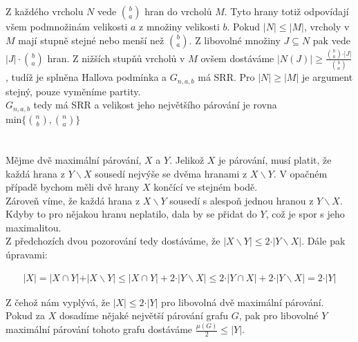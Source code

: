 \documentclass{scrartcl}
\begin{document}
        Z každého vrcholu $N$ vede $\binom{b}{a}$ hran do vrcholů $M$. Tyto hrany totiž odpovídají všem podmnožinám velikosti $a$ z množiny velikosti $b$. Pokud $\vert N \vert \leq \vert M \vert$, vrcholy v $M$ mají stupně stejné nebo menší než $\binom{b}{a}$. Z libovolné množiny $J \subseteq N$ pak vede $\vert J \vert \cdot \binom{b}{a}$ hran. Z nižších stupňů vrcholů v $M$ ovšem dostáváme $\vert N(J) \vert \geq \frac{\binom{b}{a} \cdot \vert J \vert}{\binom{b}{a}}$, tudíž je splněna Hallova podmínka a $G_{n,a,b}$ má SRR. Pro $\vert N \vert \geq \vert M \vert$ je argument stejný, pouze vyměníme partity.\\

        $G_{n,a,b}$ tedy má SRR a velikost jeho největšího párování je rovna $\text{min}\{\binom{n}{b},\binom{n}{a}\}$
        
    \section{}
        Mějme dvě maximální párování, $X$ a $Y$. Jelikož $X$ je párování, musí platit, že každá hrana z $Y \backslash X$ sousedí nejvýše se dvěma hranami z $X \backslash Y$. V opačném případě bychom měli dvě hrany $X$ končící ve stejném bodě.\\
        
        Zároveň víme, že každá hrana z $X \backslash Y$ sousedí s alespoň jednou hranou z $Y \backslash X$. Kdyby to pro nějakou hranu neplatilo, dala by se přidat do $Y$, což je spor s jeho maximalitou.\\

        Z předchozích dvou pozorování tedy dostáváme, že $\vert X \backslash Y \vert \leq 2 \cdot \vert Y \backslash X \vert$. Dále pak úpravami:

        \begin{align*}
            \vert X \vert = \vert X \cap Y \vert + \vert X \backslash Y \vert \leq \vert X \cap Y \vert + 2 \cdot \vert Y \backslash X \vert \leq 2 \cdot \vert Y \cap X \vert + 2 \cdot \vert Y \backslash X \vert = 2 \cdot \vert Y \vert
        \end{align*}

        Z čehož nám vyplývá, že $\vert X \vert \leq 2 \cdot \vert Y \vert$ pro libovolná dvě maximální párování. Pokud za $X$ dosadíme nějaké největší párování grafu $G$, pak pro libovolné $Y$ maximální párování tohoto grafu dostáváme $\frac{ \mu (G)}{2} \leq \vert Y \vert$.
    
\end{document}
